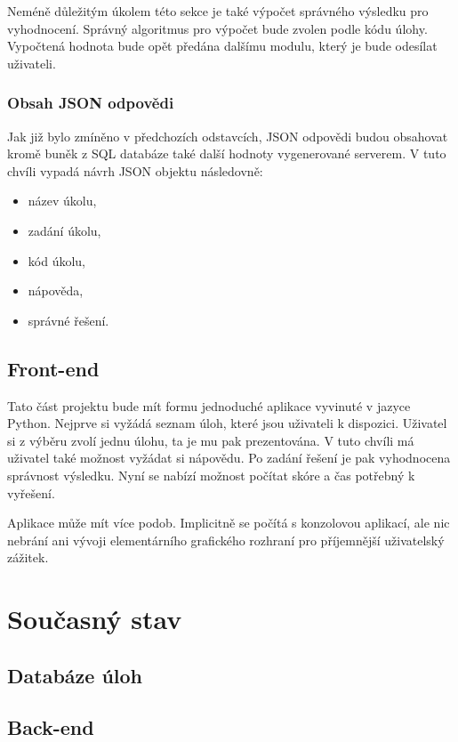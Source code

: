 \documentclass[titlepage]{article}
\begin{document}
Neméně důležitým úkolem této sekce je také výpočet správného výsledku pro vyhodnocení. Správný algoritmus pro výpočet bude zvolen podle kódu úlohy. Vypočtená hodnota bude opět předána dalšímu modulu, který je bude odesílat uživateli. 

\subsubsection{Obsah JSON odpovědi}
Jak již bylo zmíněno v předchozích odstavcích, JSON odpovědi budou obsahovat kromě buněk z SQL databáze také další hodnoty vygenerované serverem. V tuto chvíli vypadá návrh JSON objektu následovně:
\begin{itemize}
    \item název úkolu,
    \item zadání úkolu,
    \item kód úkolu,
    \item nápověda,
    \item správné řešení.
\end{itemize}


\subsection{Front-end}
Tato část projektu bude mít formu jednoduché aplikace vyvinuté v jazyce Python. Nejprve si vyžádá seznam úloh, které jsou uživateli k dispozici. Uživatel si z výběru zvolí jednu úlohu, ta je mu pak prezentována. V tuto chvíli má uživatel také možnost vyžádat si nápovědu. Po zadání řešení je pak vyhodnocena správnost výsledku. Nyní se nabízí možnost počítat skóre a čas potřebný k vyřešení. 

Aplikace může mít více podob. Implicitně se počítá s konzolovou aplikací, ale nic nebrání ani vývoji elementárního grafického rozhraní pro příjemnější uživatelský zážitek. 



\section{Současný stav}
\subsection{Databáze úloh}

\subsection{Back-end}
\end{document}
